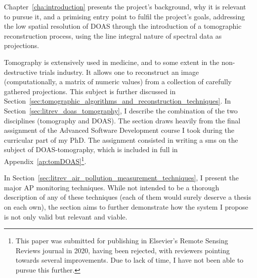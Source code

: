 
Chapter~\ref{cha:introduction} presents the project's background, why it
is relevant to pursue it, and a primising entry point to fulfil the
project's goals, addressing the low spatial resolution of \gls{DOAS}
through the introduction of a tomographic reconstruction process, using
the line integral nature of spectral data as projections.

Tomography is extensively used in medicine, and to some extent in the
non-destructive trials industry. It allows one to reconstruct an image
(computationally, a matrix of numeric values) from a collection of
carefully gathered projections. This subject is further discussed in
Section~\ref{sec:tomographic_algorithms_and_reconstruction_techniques}.
In Section~\ref{sec:litrev_doas_tomography}, I describe the combination
of the two disciplines (tomography and \gls{DOAS}). The section draws
heavily from the final assignment of the Advanced Software Development
course I took during the curricular part of my PhD. The assignment
consisted in writing a \gls{sms} on the subject of DOAS-tomography,
which is included in full in Appendix~\ref{ap:tomDOAS}\footnote{This
    paper was submitted for publishing in Elsevier's Remote Sensing
    Reviews journal in 2020, having been rejected, with reviewers
pointing towards several improvements. Due to lack of time, I have not
been able to pursue this further.}.  

In Section~\ref{sec:litrev_air_pollution_measurement_techniques}, I
present the major \gls{AP} monitoring techniques. While not intended to
be a thorough description of any of these techniques (each of them would
surely deserve a thesis on each own), the section aims to further
demonstrate how the system I propose is not only valid but relevant and
viable.
